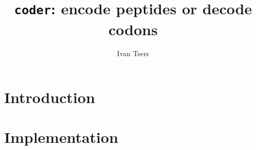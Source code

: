 \documentclass[a4paper]{article}
\begin{document}
\pagestyle{noweb}

\title{\texttt{coder}: encode peptides or decode codons}
\author{Ivan Tsers}
\date{}
\maketitle

\tableofcontents

\section{Introduction}

\section{Implementation}

\end{document}
